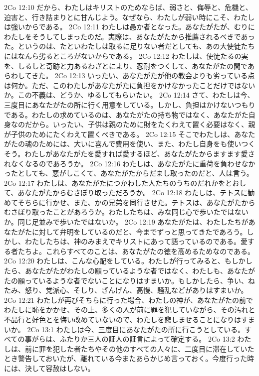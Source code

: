2Co 12:10  だから、わたしはキリストのためならば、弱さと、侮辱と、危機と、迫害と、行き詰まりとに甘んじよう。なぜなら、わたしが弱い時にこそ、わたしは強いからである。
2Co 12:11  わたしは愚か者となった。あなたがたが、むりにわたしをそうしてしまったのだ。実際は、あなたがたから推薦されるべきであった。というのは、たといわたしは取るに足りない者だとしても、あの大使徒たちにはなんら劣るところがないからである。
2Co 12:12  わたしは、使徒たるの実を、しるしと奇跡と力あるわざとにより、忍耐をつくして、あなたがたの間であらわしてきた。
2Co 12:13  いったい、あなたがたが他の教会よりも劣っている点は何か。ただ、このわたしがあなたがたに負担をかけなかったことだけではないか。この不義は、どうか、ゆるしてもらいたい。
2Co 12:14  さて、わたしは今、三度目にあなたがたの所に行く用意をしている。しかし、負担はかけないつもりである。わたしの求めているのは、あなたがたの持ち物ではなく、あなたがた自身なのだから。いったい、子供は親のために財をたくわえて置く必要はなく、親が子供のためにたくわえて置くべきである。
2Co 12:15  そこでわたしは、あなたがたの魂のためには、大いに喜んで費用を使い、また、わたし自身をも使いつくそう。わたしがあなたがたを愛すれば愛するほど、あなたがたからますます愛されなくなるのであろうか。
2Co 12:16  わたしは、あなたがたに重荷を負わせなかったとしても、悪がしこくて、あなたがたからだまし取ったのだと、人は言う。
2Co 12:17  わたしは、あなたがたにつかわした人たちのうちのだれかをとおして、あなたがたからむさぼり取っただろうか。
2Co 12:18  わたしは、テトスに勧めてそちらに行かせ、また、かの兄弟を同行させた。テトスは、あなたがたからむさぼり取ったことがあろうか。わたしたちは、みな同じ心で歩いたではないか。同じ足並みで歩いたではないか。
2Co 12:19  あなたがたは、わたしたちがあなたがたに対して弁明をしているのだと、今までずっと思ってきたであろう。しかし、わたしたちは、神のみまえでキリストにあって語っているのである。愛する者たちよ。これらすべてのことは、あなたがたの徳を高めるためなのである。
2Co 12:20  わたしは、こんな心配をしている。わたしが行ってみると、もしかしたら、あなたがたがわたしの願っているような者ではなく、わたしも、あなたがたの願っているような者でないことになりはすまいか。もしかしたら、争い、ねたみ、怒り、党派心、そしり、ざんげん、高慢、騒乱などがありはすまいか。
2Co 12:21  わたしが再びそちらに行った場合、わたしの神が、あなたがたの前でわたしに恥をかかせ、その上、多くの人が前に罪を犯していながら、その汚れと不品行と好色とを悔い改めていないので、わたしを悲しませることになりはすまいか。
2Co 13:1  わたしは今、三度目にあなたがたの所に行こうとしている。すべての事がらは、ふたりか三人の証人の証言によって確定する。
2Co 13:2  わたしは、前に罪を犯した者たちやその他のすべての人々に、二度目に滞在していたとき警告しておいたが、離れている今またあらかじめ言っておく。今度行った時には、決して容赦はしない。

